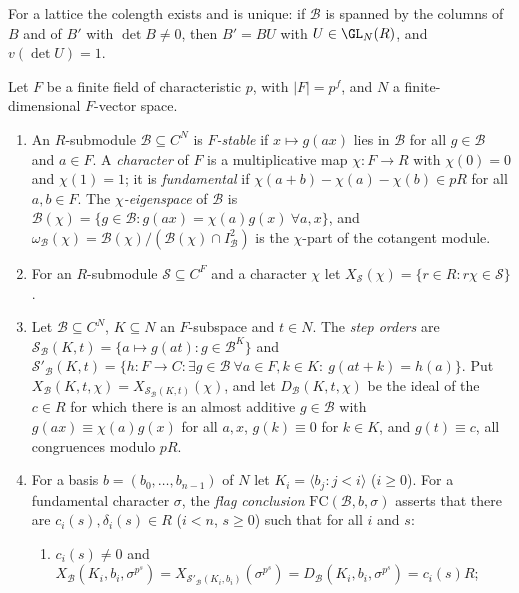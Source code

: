 For a lattice the colength exists and is unique: if $\mathcal B$ is spanned by the columns of $B$ and of $B'$ with
$\det B\ne0$, then $B'=BU$ with $U\in\GL_N(R)$, and $v(\det U)=1$.

\begin{definition}\label{pf:tower:def-flag}
Let $F$ be a finite field of characteristic $p$, with $|F|=p^f$, and $N$ a finite-dimensional $F$-vector space.
\begin{enumerate}[label=(\alph*)]
\item An $R$-submodule $\mathcal B\subseteq C^N$ is \emph{$F$-stable} if $x\mapsto g(ax)$ lies in $\mathcal B$ for all
  $g\in\mathcal B$ and $a\in F$. A \emph{character} of $F$ is a multiplicative map $\chi\colon F\to R$ with $\chi(0)=0$ and
  $\chi(1)=1$; it is \emph{fundamental} if $\chi(a+b)-\chi(a)-\chi(b)\in pR$ for all $a,b\in F$. The
  \emph{$\chi$-eigenspace} of $\mathcal B$ is $\mathcal B(\chi)=\{g\in\mathcal B:g(ax)=\chi(a)g(x)\ \forall a,x\}$, and
  $\omega_{\mathcal B}(\chi)=\mathcal B(\chi)/(\mathcal B(\chi)\cap I^2_{\mathcal B})$ is the $\chi$-part of the cotangent
  module.
\item For an $R$-submodule $\mathcal S\subseteq C^F$ and a character $\chi$ let $X_{\mathcal S}(\chi)=\{r\in R:r\chi\in\mathcal S\}$.
\item Let $\mathcal B\subseteq C^N$, $K\subseteq N$ an $F$-subspace and $t\in N$. The \emph{step orders} are
  $\mathcal S_{\mathcal B}(K,t)=\{a\mapsto g(at):g\in\mathcal B^K\}$ and
  $\mathcal S'_{\mathcal B}(K,t)=\{h\colon F\to C:\exists g\in\mathcal B\ \forall a\in F,k\in K:\ g(at+k)=h(a)\}$. Put
  $X_{\mathcal B}(K,t,\chi)=X_{\mathcal S_{\mathcal B}(K,t)}(\chi)$, and let $D_{\mathcal B}(K,t,\chi)$ be the ideal of the
  $c\in R$ for which there is an almost additive $g\in\mathcal B$ with $g(ax)\equiv\chi(a)g(x)$ for all $a,x$,
  $g(k)\equiv0$ for $k\in K$, and $g(t)\equiv c$, all congruences modulo $pR$.
\item For a basis $b=(b_0,\dots,b_{n-1})$ of $N$ let $K_i=\langle b_j:j<i\rangle$ ($i\ge0$). For a fundamental character
  $\sigma$, the \emph{flag conclusion} $\mathrm{FC}(\mathcal B,b,\sigma)$ asserts that there are $c_i(s),\delta_i(s)\in R$
  ($i<n$, $s\ge0$) such that for all $i$ and $s$:
  \begin{enumerate}[label=(FC\arabic*)]
  \item $c_i(s)\ne0$ and $X_{\mathcal B}(K_i,b_i,\sigma^{p^s})=X_{\mathcal S'_{\mathcal B}(K_i,b_i)}(\sigma^{p^s})
    =D_{\mathcal B}(K_i,b_i,\sigma^{p^s})=c_i(s)R$;

\end{enumerate}
\end{enumerate}
\end{definition}
